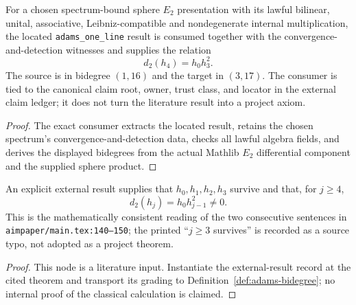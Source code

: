 \begin{theorem}
  \label{thm:external-adams-h4-d2-slice}
  \leanok
  For a chosen spectrum-bound sphere $E_2$ presentation with its lawful
  bilinear, unital, associative, Leibniz-compatible and nondegenerate
  internal multiplication, the located \texttt{adams\_one\_line} result is
  consumed together with the convergence-and-detection witnesses and supplies the
  relation
  \[
    d_2(h_4)=h_0h_3^2.
  \]
  The source is in bidegree $(1,16)$ and the target in $(3,17)$.  The consumer
  is tied to the canonical claim root, owner, trust class, and locator in the
  external claim ledger; it does not turn the literature result into a project
  axiom.
\end{theorem}

\begin{proof}
  The exact consumer extracts the located result, retains the chosen
  spectrum's convergence-and-detection data, checks all lawful algebra fields, and
  derives the displayed bidegrees from the actual Mathlib $E_2$ differential
  component and the supplied sphere product.
\end{proof}

\begin{theorem}
  \label{thm:external-adams-one-line}
  \notready
  An explicit external result supplies that $h_0,h_1,h_2,h_3$ survive and
  that, for $j\ge4$,
  \[
    d_2(h_j)=h_0h_{j-1}^2\ne0.
  \]
  This is the mathematically consistent reading of the two consecutive
  sentences in \texttt{aimpaper/main.tex:140--150}; the printed ``$j\ge3$
  survives'' is recorded as a source typo, not adopted as a project theorem.
\end{theorem}

\begin{proof}
  This node is a literature input.  Instantiate the external-result record at
  the cited theorem and transport its grading to
  Definition~\ref{def:adams-bidegree}; no internal proof of the classical
  calculation is claimed.
\end{proof}

